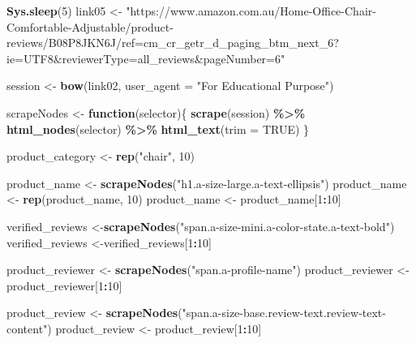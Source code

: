 \documentclass[
]{article}
\newenvironment{Shaded}{\begin{snugshade}}{\end{snugshade}}
\newcommand{\AttributeTok}[1]{\textcolor[rgb]{0.13,0.29,0.53}{#1}}
\newcommand{\ConstantTok}[1]{\textcolor[rgb]{0.56,0.35,0.01}{#1}}
\newcommand{\ControlFlowTok}[1]{\textcolor[rgb]{0.13,0.29,0.53}{\textbf{#1}}}
\newcommand{\DecValTok}[1]{\textcolor[rgb]{0.00,0.00,0.81}{#1}}
\newcommand{\FunctionTok}[1]{\textcolor[rgb]{0.13,0.29,0.53}{\textbf{#1}}}
\newcommand{\NormalTok}[1]{#1}
\newcommand{\OtherTok}[1]{\textcolor[rgb]{0.56,0.35,0.01}{#1}}
\newcommand{\SpecialCharTok}[1]{\textcolor[rgb]{0.81,0.36,0.00}{\textbf{#1}}}
\newcommand{\StringTok}[1]{\textcolor[rgb]{0.31,0.60,0.02}{#1}}
\begin{document}
\begin{Shaded}
\begin{Highlighting}[]
   \FunctionTok{Sys.sleep}\NormalTok{(}\DecValTok{5}\NormalTok{)}
\NormalTok{link05 }\OtherTok{\textless{}{-}} \StringTok{"https://www.amazon.com.au/Home{-}Office{-}Chair{-}Comfortable{-}Adjustable/product{-}reviews/B08P8JKN6J/ref=cm\_cr\_getr\_d\_paging\_btm\_next\_6?ie=UTF8\&reviewerType=all\_reviews\&pageNumber=6"}


\NormalTok{  session }\OtherTok{\textless{}{-}} \FunctionTok{bow}\NormalTok{(link02,}
               \AttributeTok{user\_agent =} \StringTok{"For Educational Purpose"}\NormalTok{)}

\NormalTok{  scrapeNodes }\OtherTok{\textless{}{-}} \ControlFlowTok{function}\NormalTok{(selector)\{}
    \FunctionTok{scrape}\NormalTok{(session) }\SpecialCharTok{\%\textgreater{}\%}
      \FunctionTok{html\_nodes}\NormalTok{(selector) }\SpecialCharTok{\%\textgreater{}\%}
      \FunctionTok{html\_text}\NormalTok{(}\AttributeTok{trim =} \ConstantTok{TRUE}\NormalTok{)}
\NormalTok{  \}}

\NormalTok{  product\_category }\OtherTok{\textless{}{-}} \FunctionTok{rep}\NormalTok{(}\StringTok{"chair"}\NormalTok{, }\DecValTok{10}\NormalTok{)}

\NormalTok{  product\_name }\OtherTok{\textless{}{-}} \FunctionTok{scrapeNodes}\NormalTok{(}\StringTok{"h1.a{-}size{-}large.a{-}text{-}ellipsis"}\NormalTok{)}
\NormalTok{  product\_name }\OtherTok{\textless{}{-}} \FunctionTok{rep}\NormalTok{(product\_name, }\DecValTok{10}\NormalTok{)}
\NormalTok{  product\_name }\OtherTok{\textless{}{-}}\NormalTok{ product\_name[}\DecValTok{1}\SpecialCharTok{:}\DecValTok{10}\NormalTok{]}
  
\NormalTok{  verified\_reviews }\OtherTok{\textless{}{-}}\FunctionTok{scrapeNodes}\NormalTok{(}\StringTok{"span.a{-}size{-}mini.a{-}color{-}state.a{-}text{-}bold"}\NormalTok{)}
\NormalTok{  verified\_reviews }\OtherTok{\textless{}{-}}\NormalTok{verified\_reviews[}\DecValTok{1}\SpecialCharTok{:}\DecValTok{10}\NormalTok{]}
  
\NormalTok{  product\_reviewer }\OtherTok{\textless{}{-}} \FunctionTok{scrapeNodes}\NormalTok{(}\StringTok{"span.a{-}profile{-}name"}\NormalTok{)}
\NormalTok{  product\_reviewer }\OtherTok{\textless{}{-}}\NormalTok{ product\_reviewer[}\DecValTok{1}\SpecialCharTok{:}\DecValTok{10}\NormalTok{]}
  
\NormalTok{  product\_review }\OtherTok{\textless{}{-}} \FunctionTok{scrapeNodes}\NormalTok{(}\StringTok{"span.a{-}size{-}base.review{-}text.review{-}text{-}content"}\NormalTok{)}
\NormalTok{  product\_review }\OtherTok{\textless{}{-}}\NormalTok{ product\_review[}\DecValTok{1}\SpecialCharTok{:}\DecValTok{10}\NormalTok{]}
  

\end{Highlighting}
\end{Shaded}
\end{document}
